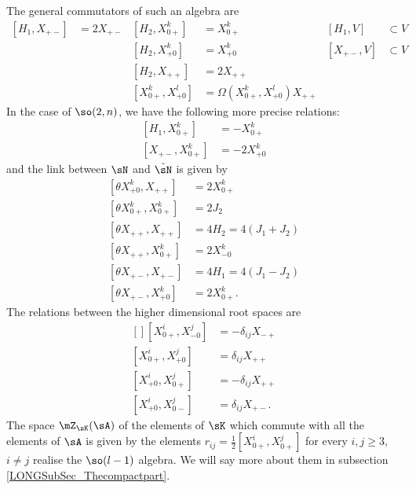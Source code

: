 The general commutators of such an algebra are
\begin{subequations}		\label{LONGsubEqsGenPySO}
\begin{align}
	[H_1,X_{+-}]		&=2X_{+-}	&	[H_2,X_{0+}^{k}]	&=X_{0+}^{k}				&[H_1,V]	&\subset V	\\		
				&		&	[H_2,X_{+0}^{k}]	&=X_{+0}^{k}				&[X_{+-},V]	&\subset V	\\	
				&		&	[H_2,X_{++}]		&=2X_{++}								\\
				&		&	[X_{0+}^k,X_{+0}^l]	&=\Omega(X_{0+}^k,X_{+0}^l)X_{++}
\end{align}
\end{subequations}
In the case of $\so(2,n)$, we have the following more precise relations:
\begin{subequations}		\label{LONGSubEqsPlusPresPySO}
	\begin{align}
		[H_1,X^k_{0+}]&=-X^k_{0+}\\		
		[X_{+-},X^k_{0+}]&=-2X^k_{+0}
	\end{align}
\end{subequations}
and the link between $\sN$ and $\tilde\sN$ is given by
\begin{subequations}		\label{LONGSubEqsThethaPySO}
	\begin{align}
		[\theta X_{+0}^{k},X_{++}]	&=2X_{0+}^{k}\\
		[\theta X_{0+}^{k},X^k_{0+}]	&=2J_2\\
		[\theta X_{++},X_{++}]		&=4H_2=4(J_1+J_2)\\
		[\theta X_{++},X^{k}_{0+}]	&=2X_{-0}^{k}\\
		[\theta X_{+-},X_{+-}]		&=4H_1=4(J_1-J_2)\\
		[\theta X_{+-},X^{k}_{+0}]	&=2X_{0+}^{k}.
	\end{align}
\end{subequations}
The relations between the higher dimensional root spaces are
\begin{equation}
	\begin{aligned}[]
		[X_{0+}^i,X_{-0}^j]&=-\delta_{ij}X_{-+}\\
		[X_{0+}^i,X_{+0}^j]&=\delta_{ij}X_{++}\\
		[X_{+0}^i,X_{0+}^j]&=-\delta_{ij}X_{++}\\
		[X_{+0}^i,X_{0-}^j]&=\delta_{ij}X_{+-}.
	\end{aligned}
\end{equation}
%
%
The space $\mZ_{\sK}(\sA)$ of the elements of $\sK$ which commute with all the elements of $\sA$ is given by the elements $r_{ij}=\frac{ 1 }{2}[X_{0+}^i,X_{0+}^j]$ for every $i,j\geq 3$, $i\neq j$ realise the $\so(l-1)$ algebra. We will say more about them in subsection \ref{LONGSubSec_Thecompactpart}.


